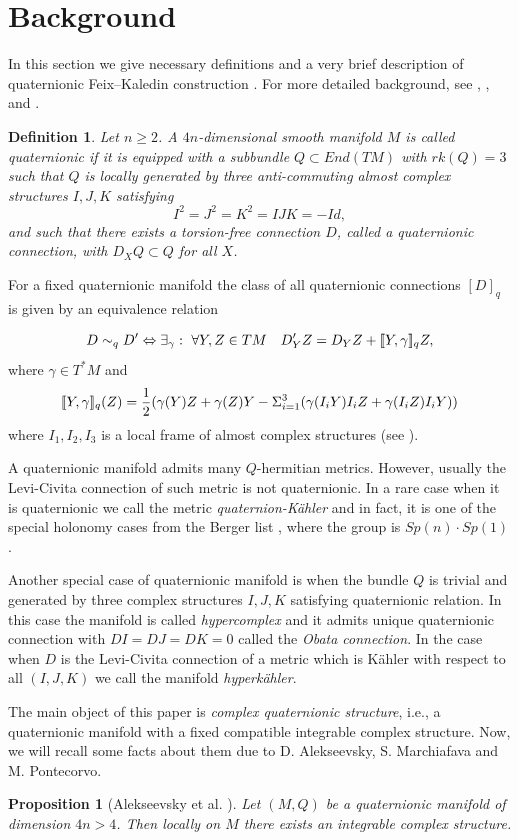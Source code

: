 \documentclass{amsart}
\newtheorem{prop}{Proposition}[section]
\newtheorem{defi}{Definition}[section]
\newcommand{\abrack}[1]{[\mkern-3mu[#1]\mkern-3mu]}
\begin{document}
\section{Background}
 In this section we give necessary definitions and a very brief description of quaternionic Feix--Kaledin construction \cite{BC}. For more detailed background, see \cite{Alex},  \cite{Bo}, \cite{BC} and \cite{SAL}. 

\begin{defi}
Let $n\geq 2$. A $4n$-dimensional smooth manifold $M$ is called quaternionic if it is equipped  with a subbundle $Q\subset End (TM)$ with $rk(Q)=3$ such that $Q$ is locally generated by three anti-commuting almost complex structures $I,J,K$ satisfying 
$$I^2=J^2=K^2=IJK=-Id,$$
and such that there exists a torsion-free connection $D$, called a quaternionic connection, with $D_XQ\subset Q$ for all $X$. 
\end{defi}

For a fixed quaternionic manifold the class of all quaternionic connections $[D]_q$ is  given by an equivalence relation

\begin{equation}\label{q-structure} D\sim_q D' \Leftrightarrow \exists_{\gamma}:\ \forall Y,Z\in TM \quad D'_YZ=D_YZ +\abrack{Y,\gamma}_qZ,\end{equation}
where $\gamma\in T^*M$ and $$\abrack{Y,\gamma}_q(Z)=\frac{1}{2}(\gamma (Y)Z+\gamma (Z)Y-\Sigma_{i=1}^3(\gamma(I_iY)I_iZ+\gamma(I_iZ)I_iY))$$ where $I_1,I_2,I_3$ is a local frame of almost complex structures (see \cite{Alex}).

A quaternionic manifold admits many $Q$-hermitian metrics. However, usually the Levi-Civita connection of such metric is not quaternionic. In a rare case when it is quaternionic we call the metric \emph{quaternion-K\"ahler} and in fact, it is one of the special holonomy cases from the Berger list \cite{Be}, where the group is $Sp(n)\cdot Sp(1) $. 

Another special case of quaternionic manifold is when the bundle $Q$ is trivial and generated by three complex structures $I,J, K$ satisfying quaternionic relation. In this case the manifold is called \emph{hypercomplex} and it admits unique quaternionic connection with $DI=DJ=DK=0$ called the \emph{Obata connection}. In the case when $D$ is the Levi-Civita connection of a metric which is K\"ahler with respect to all $(I,J,K)$ we call the manifold \emph{hyperk\"ahler}.

The main object of this paper is \emph{complex quaternionic structure}, i.e., a quaternionic manifold with a fixed compatible integrable complex structure. Now, we will recall some facts about them due to D. Alekseevsky, S. Marchiafava and M. Pontecorvo. 
\begin{prop}[Alekseevsky et al. \cite{AMP}]
 Let $(M,Q)$ be a quaternionic manifold of dimension $4n>4$. Then locally on $M$ there exists an integrable complex structure.   
\end{prop}
\end{document}
